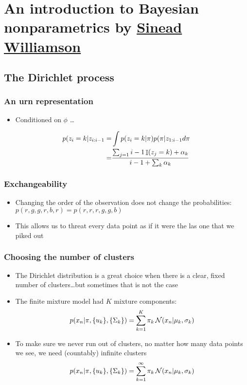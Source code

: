 \chapter{An introduction to Bayesian nonparametrics by
\href{http://sinead.github.io/}{Sinead Williamson}}

\section{The Dirichlet process}

\subsection{An urn representation}

\begin{itemize}
  \item Conditioned on $\phi$ \dots
\end{itemize}

\begin{align}
  p(z_i = k| z_{i:i-1} =& \int p(z_i = k| \pi) p(\pi|z_{1:i-1} d\pi \\
      =& \frac{\sum_{j=1}{i-1} \operatorname*{\mathbb{\mathop{I}}}(z_j = k) + \alpha_k}{i - 1 + \sum_k
      \alpha_k}
\end{align}

\subsection{Exchangeability}

\begin{itemize}
  \item Changing the order of the observation does not change the probabilities:
    $p(r,g,g,r,b,r) = p(r,r,r,g,g,b)$
  \item This allows us to threat every data point as if it were the las one
    that we piked out
\end{itemize}

\subsection{Choosing the number of clusters}

\begin{itemize}
  \item The Dirichlet distribution is a great choice when there is a clear,
    fixed number of clusters\dots but sometimes that is not the case
  \item The finite mixture model had $K$ mixture components:
    \begin{equation}
      p(x_n|\pi, \{u_k\}, \{\Sigma_k\}) = \sum_{k=1}^K \pi_k \operatorname*{\mathcal{N}}(x_n|\mu_k,
      \sigma_k)
    \end{equation}
  \item To make sure we never run out of clusters, no matter how many data
    points we see, we need (countably) infinite clusters
    \begin{equation}
      p(x_n|\pi, \{u_k\}, \{\Sigma_k\}) = \sum_{k=1}^\infty \pi_k \operatorname*{\mathcal{N}}(x_n|\mu_k,
      \sigma_k)
    \end{equation}
\end{itemize}

